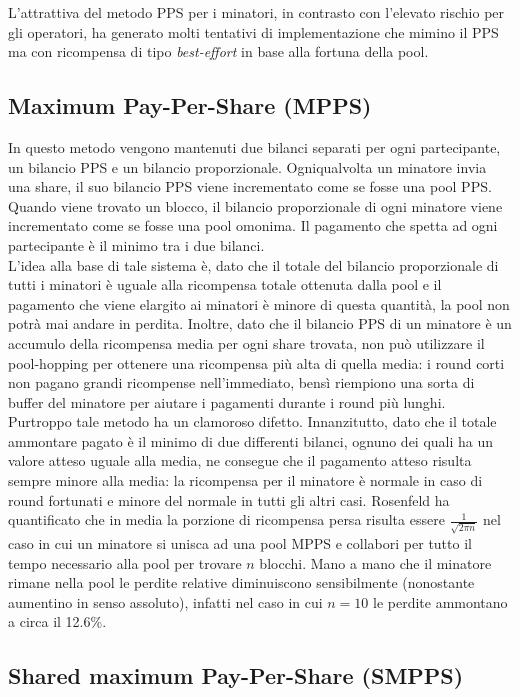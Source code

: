 L'attrattiva del metodo PPS per i minatori, in contrasto con l'elevato rischio per gli operatori, ha generato molti tentativi di implementazione che mimino il PPS ma con ricompensa di tipo \emph{best-effort} in base alla fortuna della pool.

\subsection{Maximum Pay-Per-Share (MPPS)}

In questo metodo vengono mantenuti due bilanci separati per ogni partecipante, un bilancio PPS e un bilancio proporzionale. Ogniqualvolta un minatore invia una share, il suo bilancio PPS viene incrementato come se fosse una pool PPS. Quando viene trovato un blocco, il bilancio proporzionale di ogni minatore viene incrementato come se fosse una pool omonima. Il pagamento che spetta ad ogni partecipante è il minimo tra i due bilanci.\\
L'idea alla base di tale sistema è, dato che il totale del bilancio proporzionale di tutti i minatori è uguale alla ricompensa totale ottenuta dalla pool e il pagamento che viene elargito ai minatori è minore di questa quantità, la pool non potrà mai andare in perdita. Inoltre, dato che il bilancio PPS di un minatore è un accumulo della ricompensa media per ogni share trovata, non può utilizzare il pool-hopping per ottenere una ricompensa più alta di quella media: i round corti non pagano grandi ricompense nell'immediato, bensì riempiono una sorta di buffer del minatore per aiutare i pagamenti durante i round più lunghi.
Purtroppo tale metodo ha un clamoroso difetto. Innanzitutto, dato che il totale ammontare pagato è il minimo di due differenti bilanci, ognuno dei quali ha un valore atteso uguale alla media, ne consegue che il pagamento atteso risulta sempre minore alla media: la ricompensa per il minatore è normale in caso di round fortunati e minore del normale in tutti gli altri casi.
Rosenfeld ha quantificato che in media la porzione di ricompensa persa risulta essere $\frac{1}{\sqrt{2\pi n}}$ nel caso in cui un minatore si unisca ad una pool MPPS e collabori per tutto il tempo necessario alla pool per trovare $n$ blocchi. Mano a mano che il minatore rimane nella pool le perdite relative diminuiscono sensibilmente (nonostante aumentino in senso assoluto), infatti nel caso in cui $n=10$ le perdite ammontano a circa il 12.6\%.

\subsection{Shared maximum Pay-Per-Share (SMPPS)}


